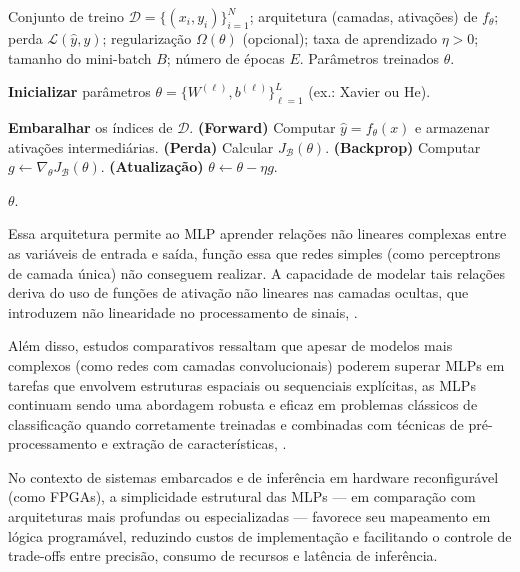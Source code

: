\begin{algorithm}[H]
	\caption{\textbf{Treinamento de uma MLP via SGD com mini-batches}}
	\label{alg:mlp_sgd_minibatch}
	\begin{algorithmic}[1]
		\Require
		Conjunto de treino \(\mathcal{D}=\{(x_i,y_i)\}_{i=1}^{N}\);
		arquitetura (camadas, ativações) de \(f_{\theta}\);
		perda \(\mathcal{L}(\hat{y},y)\);
		regularização \(\Omega(\theta)\) (opcional);
		taxa de aprendizado \(\eta>0\);
		tamanho do mini-batch \(B\);
		número de épocas \(E\).
		\Ensure
		Parâmetros treinados \(\theta\).
		
		\State \textbf{Inicializar} parâmetros \(\theta=\{W^{(\ell)},b^{(\ell)}\}_{\ell=1}^{L}\) (ex.: Xavier ou He).
		
		\State \textbf{Embaralhar} os índices de \(\mathcal{D}\).
		\State \textbf{(Forward)} Computar \(\hat{y}=f_{\theta}(x)\) e armazenar ativações intermediárias.
		\State \textbf{(Perda)} Calcular \(J_{\mathcal{B}}(\theta)\).
		\State \textbf{(Backprop)} Computar \(g \gets \nabla_{\theta} J_{\mathcal{B}}(\theta)\).
		\State \textbf{(Atualização)} \(\theta \gets \theta - \eta g\).
		\EndFor
		\EndFor
		
		\State \Return \(\theta\).
	\end{algorithmic}
\end{algorithm}


Essa arquitetura permite ao MLP aprender relações não lineares complexas entre as variáveis de entrada e saída, função essa que redes simples (como perceptrons de camada única) não conseguem realizar. A capacidade de modelar tais relações deriva do uso de funções de ativação não lineares nas camadas ocultas, que introduzem não linearidade no processamento de sinais, \cite{jaiswal2024multilayer}. 


Além disso, estudos comparativos ressaltam que apesar de modelos mais complexos (como redes com camadas convolucionais) poderem superar MLPs em tarefas que envolvem estruturas espaciais ou sequenciais explícitas, as MLPs continuam sendo uma abordagem robusta e eficaz em problemas clássicos de classificação quando corretamente treinadas e combinadas com técnicas de pré-processamento e extração de características, \cite{abd2023multi}.

No contexto de sistemas embarcados e de inferência em hardware reconfigurável (como FPGAs), a simplicidade estrutural das MLPs — em comparação com arquiteturas mais profundas ou especializadas — favorece seu mapeamento em lógica programável, reduzindo custos de implementação e facilitando o controle de trade-offs entre precisão, consumo de recursos e latência de inferência.

